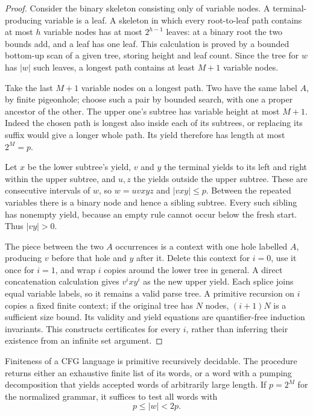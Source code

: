 \begin{proof}
Consider the binary skeleton consisting only of variable nodes.  A
terminal-producing variable is a leaf.  A skeleton in which every
root-to-leaf path contains at most $h$ variable nodes has at most
$2^{h-1}$ leaves: at a binary root the two bounds add, and a leaf has one
leaf.  This calculation is proved by a bounded bottom-up scan of a given
tree, storing height and leaf count.  Since the tree for $w$ has $|w|$
such leaves, a longest path contains at least $M+1$ variable nodes.

Take the last $M+1$ variable nodes on a longest path.  Two have the same
label $A$, by finite pigeonhole; choose such a pair by bounded search,
with one a proper ancestor of the other.  The upper one's subtree has
variable height at most $M+1$.  Indeed the chosen path is longest also
inside each of its subtrees, or replacing its suffix would give a longer
whole path.  Its yield therefore has length at most $2^M=p$.

Let $x$ be the lower subtree's yield, $v$ and $y$ the terminal yields to
its left and right within the upper subtree, and $u,z$ the yields outside
the upper subtree.  These are consecutive intervals of $w$, so
$w=uvxyz$ and $|vxy|\leq p$.  Between the repeated variables there is a
binary node and hence a sibling subtree.  Every such sibling has nonempty
yield, because an empty rule cannot occur below the fresh start.  Thus
$|vy|>0$.

The piece between the two $A$ occurrences is a context with one hole
labelled $A$, producing $v$ before that hole and $y$ after it.  Delete
this context for $i=0$, use it once for $i=1$, and wrap $i$ copies around
the lower tree in general.  A direct concatenation calculation gives
$v^i x y^i$ as the new upper yield.  Each splice joins equal variable
labels, so it remains a valid parse tree.  A primitive recursion on $i$
copies a fixed finite context; if the original tree has $N$ nodes,
$(i+1)N$ is a sufficient size bound.  Its validity and yield equations
are quantifier-free induction invariants.  This constructs certificates
for every $i$, rather than inferring their existence from an infinite
set argument.
\end{proof}

\begin{theorem}
\label{cf:finiteness}
Finiteness of a CFG language is primitive recursively decidable.  The
procedure returns either an exhaustive finite list of its words, or a
word with a pumping decomposition that yields accepted words of arbitrarily
large length.  If $p=2^M$ for the normalized grammar, it suffices to test
all words with
\[
                  p\leq |w|<2p.
\]
\end{theorem}

